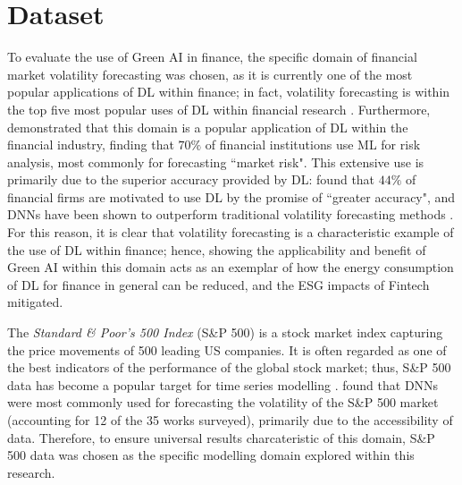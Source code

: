 \documentclass[a4paper, 11pt]{report}
\begin{document}
    \section{Dataset}
    \label{section: dataset}

    To evaluate the use of Green AI in finance, the specific domain of financial market volatility forecasting was chosen, as it is currently one of the most popular applications of DL within finance; in fact, volatility forecasting is within the top five most popular uses of DL within financial research \citep{sezer-2019}. Furthermore, \citet{chartis-2019} demonstrated that this domain is a popular application of DL within the financial industry, finding that $70\%$ of financial institutions use ML for risk analysis, most commonly for forecasting ``market risk". This extensive use is primarily due to the superior accuracy provided by DL: \citet{chartis-2019} found that $44\%$ of financial firms are motivated to use DL by the promise of ``greater accuracy", and DNNs have been shown to outperform traditional volatility forecasting methods \citep{rodikov-2022}. For this reason, it is clear that volatility forecasting is a characteristic example of the use of DL within finance; hence, showing the applicability and benefit of Green AI within this domain acts as an exemplar of how the energy consumption of DL for finance in general can be reduced, and the ESG impacts of Fintech mitigated.


    The \emph{Standard \& Poor's 500 Index} (S\&P 500) is a stock market index capturing the price movements of 500 leading US companies. It is often regarded as one of the best indicators of the performance of the global stock market; thus, S\&P 500 data has become a popular target for time series modelling \citep{thakkar-2021}. \citet{ge-2022} found that DNNs were most commonly used for forecasting the volatility of the S\&P 500 market (accounting for 12 of the 35 works surveyed), primarily due to the accessibility of data. Therefore, to ensure universal results charcateristic of this domain, S\&P 500 data was chosen as the specific modelling domain explored within this research.
\end{document}
